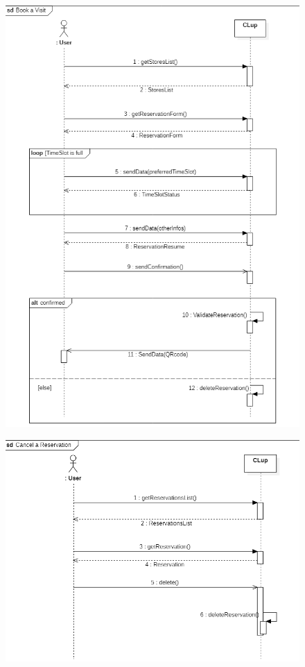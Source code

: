 \documentclass{article}
\begin{document}
\begin{figure}[H]
  \includegraphics[width=\linewidth]{BookSequence.png}
  
\end{figure}

\begin{figure}[H]
  \includegraphics[width=\linewidth]{CancelReservationSequence.png}
  
\end{figure}
\end{document}
